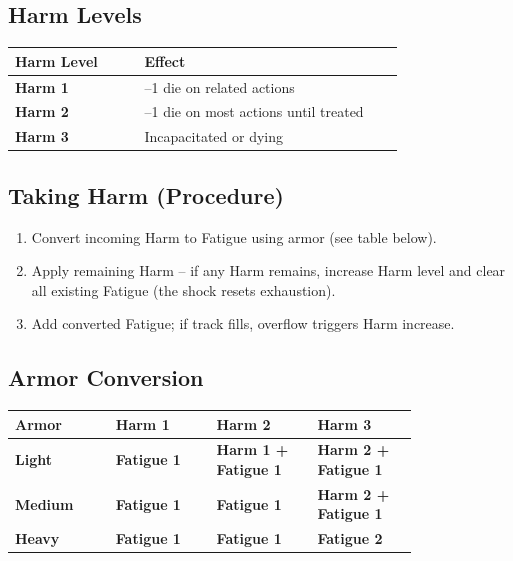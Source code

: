 \documentclass[10pt,twocolumn]{article}
\begin{document}
\subsection{Harm Levels}
\begin{coretable}
\begin{tabular}{>{\bfseries}p{0.3\linewidth} p{0.6\linewidth}}
\toprule
\textbf{Harm Level} & \textbf{Effect} \\
\midrule
Harm 1 & –1 die on related actions \\
Harm 2 & –1 die on most actions until treated \\
Harm 3 & Incapacitated or dying \\
\bottomrule
\end{tabular}
\end{coretable}

\subsection{Taking Harm (Procedure)}
\begin{enumerate}
    \item Convert incoming Harm to Fatigue using armor (see table below).
    \item Apply remaining Harm – if any Harm remains, increase Harm level and clear all existing Fatigue (the shock resets exhaustion).
    \item Add converted Fatigue; if track fills, overflow triggers Harm increase.
\end{enumerate}

\subsection{Armor Conversion}
\begin{coretable}
\begin{tabular}{>{\bfseries}p{0.2\linewidth} >{\bfseries}p{0.2\linewidth} >{\bfseries}p{0.2\linewidth} >{\bfseries}p{0.2\linewidth}}
\toprule
\textbf{Armor} & \textbf{Harm 1} & \textbf{Harm 2} & \textbf{Harm 3} \\
\midrule
Light & Fatigue 1 & Harm 1 + Fatigue 1 & Harm 2 + Fatigue 1 \\
Medium & Fatigue 1 & Fatigue 1 & Harm 2 + Fatigue 1 \\
Heavy & Fatigue 1 & Fatigue 1 & Fatigue 2 \\
\bottomrule
\end{tabular}
\end{coretable}
\end{document}
